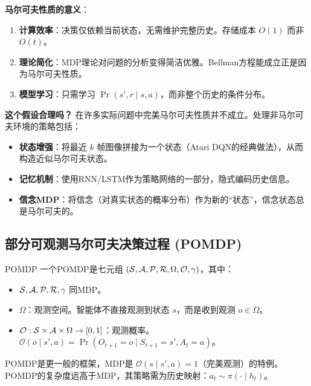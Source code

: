 \textbf{马尔可夫性质的意义}：
\begin{enumerate}
    \item \textbf{计算效率}：决策仅依赖当前状态，无需维护完整历史。存储成本 $O(1)$ 而非 $O(t)$。
    \item \textbf{理论简化}：MDP理论对问题的分析变得简洁优雅。Bellman方程能成立正是因为马尔可夫性质。
    \item \textbf{模型学习}：只需学习 $\Pr(s', r \mid s, a)$，而非整个历史的条件分布。
\end{enumerate}

\begin{remark}
\textbf{这个假设合理吗？} 在许多实际问题中完美马尔可夫性质并不成立。处理非马尔可夫环境的策略包括：
\begin{itemize}
    \item \textbf{状态增强}：将最近 $k$ 帧图像拼接为一个状态（Atari DQN的经典做法），从而构造近似马尔可夫状态。
    \item \textbf{记忆机制}：使用RNN/LSTM作为策略网络的一部分，隐式编码历史信息。
    \item \textbf{信念MDP}：将信念（对真实状态的概率分布）作为新的``状态''，信念状态总是马尔可夫的。
\end{itemize}
\end{remark}

\subsection{部分可观测马尔可夫决策过程 (POMDP)}

\begin{mydefinition}{POMDP}
一个POMDP是七元组 $(\mathcal{S}, \mathcal{A}, \mathcal{P}, \mathcal{R}, \Omega, \mathcal{O}, \gamma)$，其中：
\begin{itemize}
    \item $\mathcal{S}, \mathcal{A}, \mathcal{P}, \mathcal{R}, \gamma$ 同MDP。
    \item $\Omega$：观测空间。智能体不直接观测到状态 $s$，而是收到观测 $o \in \Omega$。
    \item $\mathcal{O}: \mathcal{S} \times \mathcal{A} \times \Omega \to [0, 1]$：观测概率。$\mathcal{O}(o \mid s', a) = \Pr(O_{t+1} = o \mid S_{t+1} = s', A_t = a)$。
\end{itemize}
\end{mydefinition}

POMDP是更一般的框架，MDP是 $\mathcal{O}(s \mid s', a) = 1$（完美观测）的特例。POMDP的复杂度远高于MDP，其策略需为历史映射：$a_t \sim \pi(\cdot \mid h_t)$。

